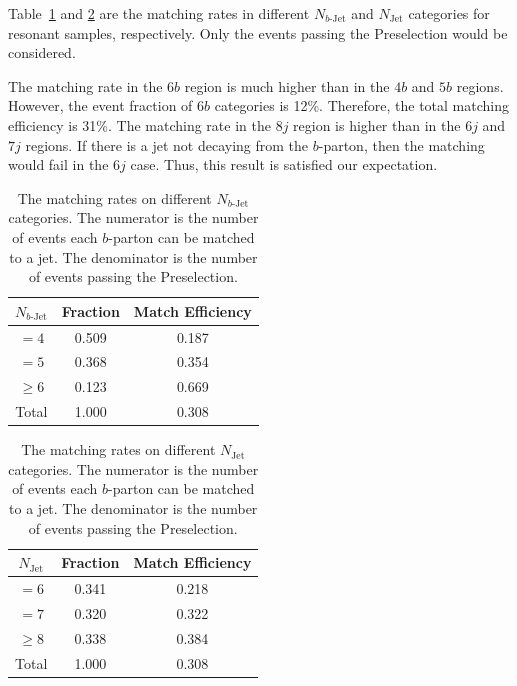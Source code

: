 \documentclass[12pt]{article}
\begin{document}
    Table~\ref{tab:resonant_match_rate_nbj} and \ref{tab:resonant_match_rate_nj} are the matching rates in different $N_{b\text{-Jet}}$ and $N_{\text{Jet}}$ categories for resonant samples, respectively. Only the events passing the Preselection would be considered.

    The matching rate in the $6b$ region is much higher than in the $4b$ and $5b$ regions. However, the event fraction of $6b$ categories is 12\%. Therefore, the total matching efficiency is 31\%. The matching rate in the $8j$ region is higher than in the $6j$ and $7j$ regions. If there is a jet not decaying from the $b$-parton, then the matching would fail in the $6j$ case. Thus, this result is satisfied our expectation.
    \begin{table}[htpb]
        \centering
        \caption{The matching rates on different $N_{b\text{-Jet}}$ categories. The numerator is the number of events each $b$-parton can be matched to a jet. The denominator is the number of events passing the Preselection.}
        \label{tab:resonant_match_rate_nbj}
        \begin{tabular}{c|c|c}
        $N_{b\text{-Jet}}$    & Fraction  & Match Efficiency     \\ \hline
        $=4$                  & 0.509 & 0.187 \\
        $=5$                  & 0.368 & 0.354 \\
        $\ge 6$               & 0.123 & 0.669 \\ \hline
        Total                 & 1.000 & 0.308
        \end{tabular}
    \end{table}
    \begin{table}[htpb]
        \centering
        \caption{The matching rates on different $N_{\text{Jet}}$ categories. The numerator is the number of events each $b$-parton can be matched to a jet. The denominator is the number of events passing the Preselection.}
        \label{tab:resonant_match_rate_nj}
        \begin{tabular}{c|c|c}
        $N_{\text{Jet}}$    & Fraction  & Match Efficiency     \\ \hline
        $=6$                  & 0.341 & 0.218 \\
        $=7$                  & 0.320 & 0.322 \\
        $\ge 8$               & 0.338 & 0.384 \\ \hline
        Total                 & 1.000 & 0.308
        \end{tabular}
    \end{table}
\end{document}
